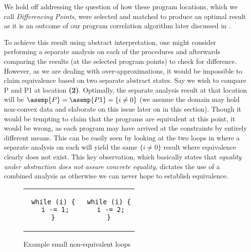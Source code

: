 We hold off addressing the question of how these program locations, which we call \emph{Differencing Points}, were selected and matched to produce an optimal result as it is an outcome of our program correlation algorithm later discussed in .

To achieve this result using abstract interpretation, one might consider performing a separate analysis on each of the procedures and afterwards comparing the results (at the selected program points) to check for difference. However, as we are dealing with over-approximations, it would be impossible to claim equivalence based on two separate abstract states. Say we wish to compare P and P1 at location \textbf{(2)}. Optimally, the separate analysis result at that location will be $\asemp{P} = \asemp{P1} = \{i \neq 0\}$ (we assume the domain may hold non-convex data and elaborate on this issue later on in this section). Though it would be tempting to claim that the programs are equivalent at this point, it would be wrong, as each program may have arrived at the constraints by entirely different means. This can be easily seen by looking at the two loops in  where a separate analysis on each will yield the same $\{i \neq 0\}$ result where equivalence clearly does not exist. This key observation, which basically states that \emph{equality under abstraction does not assure concrete equality}, dictates the use of a combined analysis as otherwise we can never hope to establish equivalence.

\begin{figure}
\centering
\begin{tabular}{cc}
\begin{lstlisting}
 while (i) {
  i -= 1;
 }
\end{lstlisting}
&
\begin{lstlisting}
 while (i) {
  i -= 2;
 }
\end{lstlisting}
\end{tabular}
\caption{Example small non-equivalent loops}
\end{figure}

